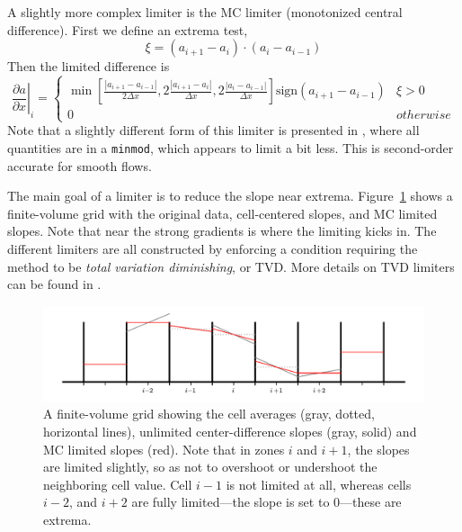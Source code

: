 A slightly more complex limiter is the MC limiter (monotonized central
difference).  First we define an extrema test,
\begin{equation}
\xi = (a_{i+1} - a_i) \cdot (a_i - a_{i-1})
\end{equation}
Then the limited difference is
\begin{equation}
\left . \frac{\partial a}{\partial x} \right |_i = 
 \left \{
\begin{array}{ll}
\min \left [ \frac{| a_{i+1} - a_{i-1} |}{2 \Delta x},
              2 \frac{| a_{i+1} - a_i |}{\Delta x},
              2 \frac{| a_{i} - a_{i-1} |}{\Delta x}
      \right ]  \mathrm{sign}(a_{i+1} - a_{i-1}) &  \xi > 0 \\
0 & \mathit{otherwise}
\end{array}
\right .
\end{equation}
%
Note that a slightly different form of this limiter is presented in
\cite{leveque:2002}, where all quantities are in a {\tt minmod}, which appears to limit a bit less.
This is second-order accurate for smooth flows.  

The main goal of a limiter is to reduce the slope near extrema.
Figure~\ref{fig:limit} shows a finite-volume grid with the original
data, cell-centered slopes, and MC limited slopes.  Note that near the
strong gradients is where the limiting kicks in.  The different limiters
are all constructed by enforcing a condition requiring the method to be
{\em total variation diminishing}, or TVD.  More details on TVD limiters
can be found in \cite{toro:1997,leveque:2002}.

\begin{figure}
\centering
\includegraphics[width=\linewidth]{generalgrid}
\caption[Piecewise linear slopes with an without
  limiting]{\label{fig:limit} A finite-volume grid showing the cell
  averages (gray, dotted, horizontal lines), unlimited center-difference slopes
  (gray, solid) and MC limited slopes (red).  Note that in zones $i$ and
  $i+1$, the slopes are limited slightly, so as not to overshoot or
  undershoot the neighboring cell value.  Cell $i-1$ is not limited at
  all, whereas cells $i-2$, and $i+2$ are fully limited---the slope is
  set to 0---these are extrema.}
\end{figure}


